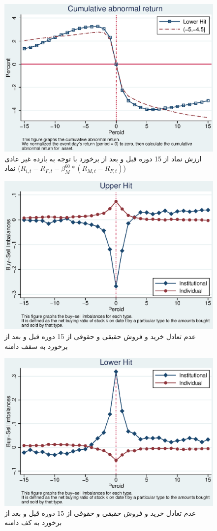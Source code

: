 \documentclass[12pt]{article}
\begin{document}
\begin{appendices}
\begin{figure}[htbp]
\centering
\includegraphics[width=0.8\columnwidth]{CLAR.eps}
\caption{ارزش نماد از 15 دوره قبل  و بعد از برخورد با توجه به بازده غیر عادی نماد
($ R_{i,t} - R_{F,t} - \beta^{60}_M * (R_{M,t} - R_{F,t}) $)
}
\label{g18}
\end{figure}


 \begin{figure}[htbp]
 \centering
 \includegraphics[width=0.8\columnwidth]{UI.eps}
 \caption{عدم تعادل خرید و فروش حقیقی و حقوقی از 15 دوره قبل  و بعد از برخورد  به سقف دامنه }
 \label{g6}
 \end{figure}


\begin{figure}[htbp]
\centering
\includegraphics[width=0.8\columnwidth]{LI.eps}
\caption{عدم تعادل خرید و فروش حقیقی و حقوقی از 15 دوره قبل   و بعد از برخورد به کف دامنه }
\label{g7}
\end{figure}



\end{appendices}
\end{document}

